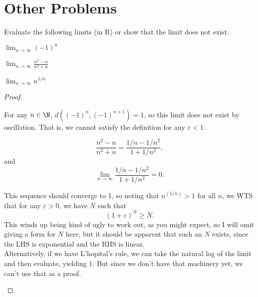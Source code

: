 \documentclass{assignment}
\begin{document}
\section*{Other Problems}
\begin{question}[1]
Evaluate the following limits (in R) or show that the limit does not exist.
\begin{qparts}
  \item $\lim_{n\to\infty}(-1)^n$
  \item $\lim_{n\to\infty} \frac{n^2 - n}{n^3 + n}$
  \item $\lim_{n\to\infty} n^{1/n}$
\end{qparts}
\end{question}
\begin{proof}\leavevmode
  \begin{qparts}
  \item For any $n\in\N$, $d((-1)^n, (-1)^{n+1}) = 1$, so this limit does not exist by oscillation. 
    That is, we cannot satisfy the definition for any $\varepsilon < 1$.
  \item $$\frac{n^2 - n}{n^3 + n} = \frac{1/n - 1/n^2}{1 + 1/n^2},$$ and 
    $$\lim_{n\to\infty} \frac{1/n - 1/n^2}{1 + 1/n^2} = 0.$$
  \item This sequence should converge to 1, so noting that $n^{(1/n)} > 1$ for all $n$, we WTS that 
    for any $\varepsilon > 0$, we have $N$ such that $$(1 + \varepsilon)^N \geq N.$$ This winds up being
    kind of ugly to work out, as you might expect, so I will omit giving a form for $N$ here, but it
    should be apparent that such an $N$ exists, since the LHS is exponential and the RHS is linear. \\

    Alternatively, if we have L'hopital's rule, we can take the natural log of the limit and then evaluate,
    yielding 1. But since we don't have that machinery yet, we can't use that as a proof.  
  \end{qparts}
\end{proof}
\end{document}
